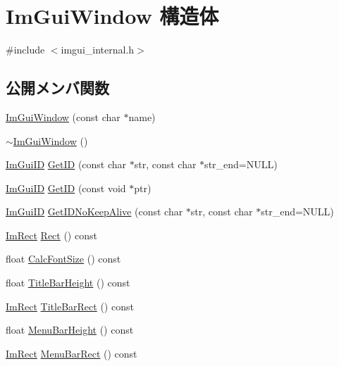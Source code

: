 \hypertarget{struct_im_gui_window}{}\section{Im\+Gui\+Window 構造体}
\label{struct_im_gui_window}


{\ttfamily \#include $<$imgui\+\_\+internal.\+h$>$}

\subsection*{公開メンバ関数}
\begin{DoxyCompactItemize}
\item 
\mbox{\hyperlink{struct_im_gui_window_abbc943558e96c8895237f0b55a66751b}{Im\+Gui\+Window}} (const char $\ast$name)
\item 
\mbox{\hyperlink{struct_im_gui_window_a8e81d730c3a39a71e6b6ca4654451c53}{$\sim$\+Im\+Gui\+Window}} ()
\item 
\mbox{\hyperlink{imgui_8h_a1785c9b6f4e16406764a85f32582236f}{Im\+Gui\+ID}} \mbox{\hyperlink{struct_im_gui_window_a66400a63bc0b54d7d29e08d1b1b1a42b}{Get\+ID}} (const char $\ast$str, const char $\ast$str\+\_\+end=N\+U\+LL)
\item 
\mbox{\hyperlink{imgui_8h_a1785c9b6f4e16406764a85f32582236f}{Im\+Gui\+ID}} \mbox{\hyperlink{struct_im_gui_window_aae21dffb343cabca9414499b827912a8}{Get\+ID}} (const void $\ast$ptr)
\item 
\mbox{\hyperlink{imgui_8h_a1785c9b6f4e16406764a85f32582236f}{Im\+Gui\+ID}} \mbox{\hyperlink{struct_im_gui_window_adc0a43f74a0b53a15a4bc4fea05524fe}{Get\+I\+D\+No\+Keep\+Alive}} (const char $\ast$str, const char $\ast$str\+\_\+end=N\+U\+LL)
\item 
\mbox{\hyperlink{struct_im_rect}{Im\+Rect}} \mbox{\hyperlink{struct_im_gui_window_a147da28bf5d167cbe0a363c4a578dea1}{Rect}} () const
\item 
float \mbox{\hyperlink{struct_im_gui_window_a6881ed65e208fb6e015d3ae6bccfc794}{Calc\+Font\+Size}} () const
\item 
float \mbox{\hyperlink{struct_im_gui_window_ad1580cc8b5bdf981c6ed2eb22ecd7dbb}{Title\+Bar\+Height}} () const
\item 
\mbox{\hyperlink{struct_im_rect}{Im\+Rect}} \mbox{\hyperlink{struct_im_gui_window_a06884e1bc80e460e51e1626b5b976196}{Title\+Bar\+Rect}} () const
\item 
float \mbox{\hyperlink{struct_im_gui_window_acfb8bdad2e3ea6102589813ae32d0364}{Menu\+Bar\+Height}} () const
\item 
\mbox{\hyperlink{struct_im_rect}{Im\+Rect}} \mbox{\hyperlink{struct_im_gui_window_a59df76c1445aaaf0b43456c83c1a88e5}{Menu\+Bar\+Rect}} () const
\end{DoxyCompactItemize}
